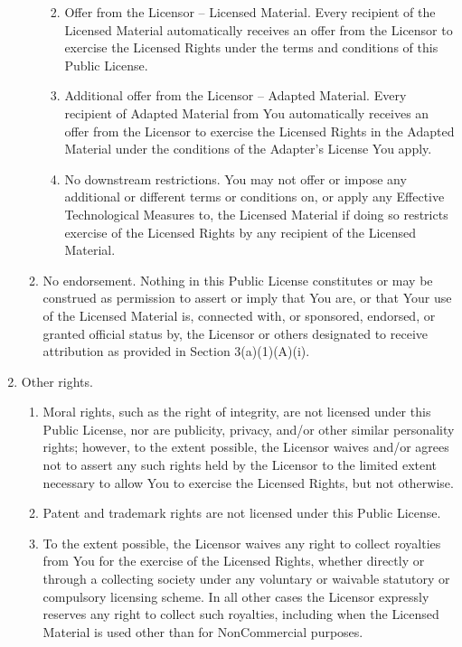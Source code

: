 \documentclass[
]{scrbook}
\begin{document}
\begin{enumerate}
\begin{enumerate}
    \begin{enumerate}
    \def\labelenumiii{\alph{enumiii}.}
    \item
      Offer from the Licensor -- Licensed Material. Every recipient of
      the Licensed Material automatically receives an offer from the
      Licensor to exercise the Licensed Rights under the terms and
      conditions of this Public License.
    \item
      Additional offer from the Licensor -- Adapted Material. Every
      recipient of Adapted Material from You automatically receives an
      offer from the Licensor to exercise the Licensed Rights in the
      Adapted Material under the conditions of the Adapter's License You
      apply.
    \item
      No downstream restrictions. You may not offer or impose any
      additional or different terms or conditions on, or apply any
      Effective Technological Measures to, the Licensed Material if
      doing so restricts exercise of the Licensed Rights by any
      recipient of the Licensed Material.
    \end{enumerate}
  \item
    No endorsement. Nothing in this Public License constitutes or may be
    construed as permission to assert or imply that You are, or that
    Your use of the Licensed Material is, connected with, or sponsored,
    endorsed, or granted official status by, the Licensor or others
    designated to receive attribution as provided in Section
    3(a)(1)(A)(i).
  \end{enumerate}
\item
  Other rights.

  \begin{enumerate}
  \def\labelenumii{\arabic{enumii}.}
  \item
    Moral rights, such as the right of integrity, are not licensed under
    this Public License, nor are publicity, privacy, and/or other
    similar personality rights; however, to the extent possible, the
    Licensor waives and/or agrees not to assert any such rights held by
    the Licensor to the limited extent necessary to allow You to
    exercise the Licensed Rights, but not otherwise.
  \item
    Patent and trademark rights are not licensed under this Public
    License.
  \item
    To the extent possible, the Licensor waives any right to collect
    royalties from You for the exercise of the Licensed Rights, whether
    directly or through a collecting society under any voluntary or
    waivable statutory or compulsory licensing scheme. In all other
    cases the Licensor expressly reserves any right to collect such
    royalties, including when the Licensed Material is used other than
    for NonCommercial purposes.
  \end{enumerate}
\end{enumerate}
\end{document}
